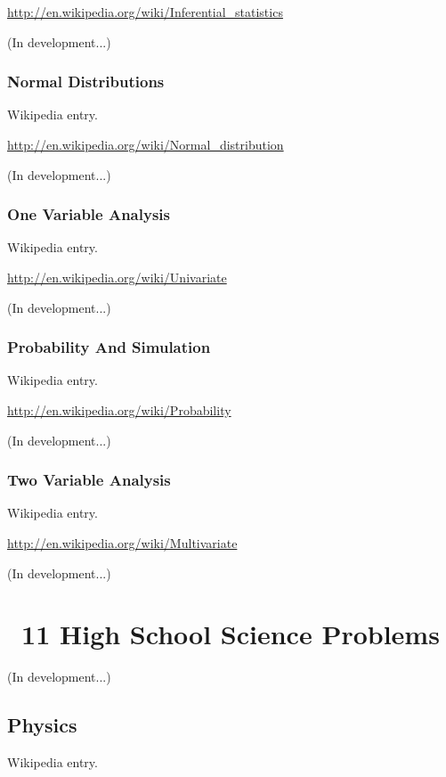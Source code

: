 \documentclass[12pt,twoside]{book}
\begin{document}
\href{http://en.wikipedia.org/wiki/Inferential_statistics}{http://en.wikipedia.org/wiki/Inferential\_statistics}

(In development...)

\subsection[Normal Distributions]{Normal
Distributions}
Wikipedia entry.

\href{http://en.wikipedia.org/wiki/Normal_distribution}{http://en.wikipedia.org/wiki/Normal\_distribution}

(In development...)

\subsection[One Variable Analysis]{One Variable
Analysis}
Wikipedia entry.

\href{http://en.wikipedia.org/wiki/Univariate}{http://en.wikipedia.org/wiki/Univariate}

(In development...)

\subsection[Probability And Simulation]{Probability
And Simulation}
Wikipedia entry.

\href{http://en.wikipedia.org/wiki/Probability}{http://en.wikipedia.org/wiki/Probability}

(In development...)

\subsection[Two Variable Analysis]{Two Variable
Analysis}
Wikipedia entry.

\href{http://en.wikipedia.org/wiki/Multivariate}{http://en.wikipedia.org/wiki/Multivariate}

(In development...)

\chapter[\ 11 High School Science Problems]{\ 11 High School Science
Problems}
(In development...)

\section[Physics]{Physics}
Wikipedia entry.
\end{document}
